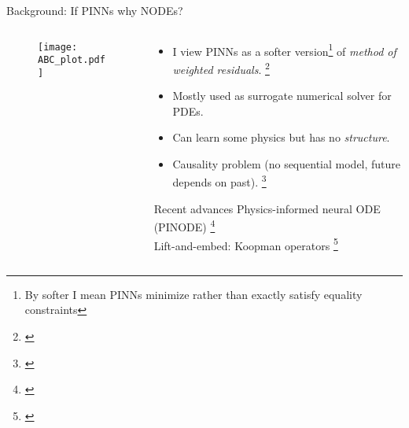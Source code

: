 \documentclass[dvipsnames, 9pt]{beamer}
\begin{document}
\begin{frame}{Background: If PINNs why NODEs?}
    \begin{columns}
    {\begin{column}{0.5\textwidth}
    \begin{figure}[h]
        \centering
        \texttt{[image: ABC\_plot.pdf]} 
    \end{figure}
    \end{column}}
    {\begin{column}{0.45\textwidth}
    \begin{block}{}
        \begin{itemize}  %
            \item I view PINNs as a softer version\footnote[frame]{By softer I 
            mean PINNs minimize rather than exactly satisfy equality constraints } of \textit{method of weighted residuals}.
            \footnote[frame]{\cite{villadsen:stewart:1967}}
            \item Mostly used as surrogate numerical solver for PDEs.
            \item Can learn some physics but has no \textit{structure}.
            \item Causality problem (no sequential model, future depends on past).
            \footnote[frame]{\cite{wang:shyam:paris:2022}}
        \end{itemize}
    \end{block}
    \begin{block}{Recent advances}
        Physics-informed neural ODE (PINODE) \footnote[frame]{\cite{sholokhov:liu:mansour:nabi:2023}} \\
        Lift-and-embed: Koopman operators \footnote[frame]{\cite{liu:sholokov:mansour:nabi:2024}}
    \end{block}
    \end{column}}
    \end{columns}
\end{frame}
\end{document}

